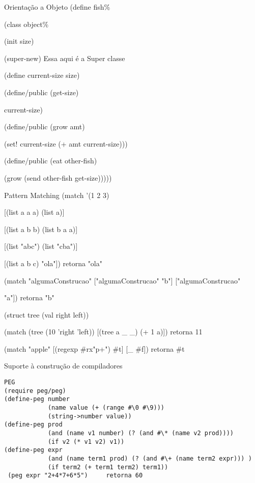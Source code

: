 \documentclass{beamer}
\begin{document}
\begin{frame}{Orientação a Objeto}
(define fish\%

  (class object\%
  
    (init size) 
    
    (super-new) Essa aqui é a Super classe
    
    (define current-size size)
    
    (define/public (get-size)
    
      current-size)
      
    (define/public (grow amt)
    
      (set! current-size (+ amt current-size)))
      
    (define/public (eat other-fish)
    
      (grow (send other-fish get-size)))))


\end{frame}


\begin{frame}[fragile]{Pattern Matching}
(match '(1 2 3)
 
      [(list a a a) (list a)]
      
      [(list a b b) (list b a a)]
      
      [(list "abc") (list "cba")]
      
      [(list a b c) "ola"]) retorna "ola"
      
 (match "algumaConstrucao" ["algumaConstrucao" "b"] ["algumaConstrucao" 
 
 "a"]) retorna "b"
 
 (struct tree (val right left))
 
 (match (tree (10 'right 'left)) [(tree a \_ \_) (+ 1 a)]) retorna 11
 
 (match "apple" [(regexp \#rx"p+") \#t] [\_ \#f])  retorna \#t
\end{frame}




\begin{frame}[fragile]{Suporte à construção de compiladores}
\begin{verbatim}
PEG
(require peg/peg)
(define-peg number
            (name value (+ (range #\0 #\9)))
            (string->number value))
(define-peg prod
            (and (name v1 number) (? (and #\* (name v2 prod))))
            (if v2 (* v1 v2) v1))
(define-peg expr
            (and (name term1 prod) (? (and #\+ (name term2 expr))) )
            (if term2 (+ term1 term2) term1))
 (peg expr "2+4*7+6*5")     retorna 60
\end{verbatim}
\end{frame}
\end{document}
